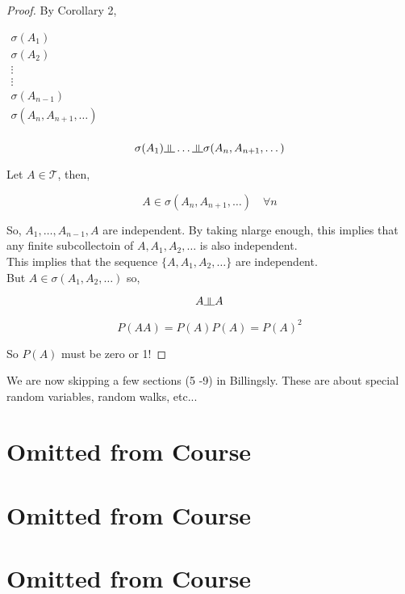 \documentclass[11pt,fleqn]{book} %
\newcommand{\indep}{\rotatebox[origin=c]{90}{$\models$}}
\begin{document}
\begin{proof}
	By Corollary 2, 

	$\begin{matrix}
		\sigma(A_1)\\
		\sigma(A_2)\\
		\vdots\\
		\vdots\\
		\sigma(A_{n-1})\\
		\sigma(A_n, A_{n+1}, \dots)\\
	\end{matrix}$

	$$\sigma(A_1) \indep \dots \indep \sigma(A_n, A_{n+1}, \dots)$$

	Let $A \in \mathcal{T}$, then,

	$$A \in \sigma(A_n, A_{n+1}, \dots) \quad \forall n$$

	So, $A_1, \dots, A_{n-1}, A$ are independent. By taking nlarge enough, this implies that any  finite subcollectoin of $A, A_1, A_2, \dots$ is also independent. \\

	This implies that the sequence $\{ A, A_1, A_2, \dots\}$ are independent. \\

	But $A \in \sigma(A_1, A_2, \dots)$ so, 

	$$A \indep A$$

	$$ P(AA) = P(A)P(A) = P(A)^2 $$

	So $P(A)$ must be zero or 1! 

\end{proof}

\begin{remark}
	We are now skipping a few sections (5 -9) in Billingsly. These are about special random variables, random walks, etc...
\end{remark}




\section{Omitted from Course}

\section{Omitted from Course}

\section{Omitted from Course}
\end{document}
